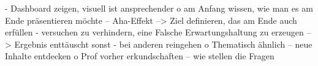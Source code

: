 -	Dashboard zeigen, visuell ist ansprechender
    o	am Anfang wissen, wie man es am Ende präsentieren möchte – Aha-Effekt
        --> Ziel definieren, das am Ende auch erfüllen
-	versuchen zu verhindern, eine Falsche Erwartungshaltung zu erzeugen
    --> Ergebnis enttäuscht sonst
-	bei anderen reingehen
    o	Thematisch ähnlich – neue Inhalte entdecken
    o	Prof vorher erkundschaften – wie stellen die Fragen
